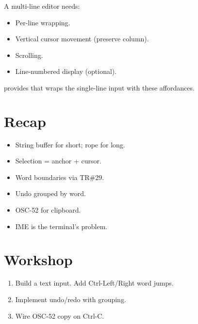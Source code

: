 A multi-line editor needs:
\begin{itemize}[leftmargin=*]
  \item Per-line wrapping.
  \item Vertical cursor movement (preserve column).
  \item Scrolling.
  \item Line-numbered display (optional).
\end{itemize}

\maya{} provides  that wraps the
single-line input with these affordances.

\section{Recap}

\begin{recap}
\begin{itemize}[leftmargin=*]
  \item String buffer for short; rope for long.
  \item Selection = anchor + cursor.
  \item Word boundaries via TR\#29.
  \item Undo grouped by word.
  \item OSC-52 for clipboard.
  \item IME is the terminal's problem.
\end{itemize}
\end{recap}

\section*{Workshop}

\begin{enumerate}[leftmargin=*]
  \item Build a text input. Add Ctrl-Left/Right word jumps.
  \item Implement undo/redo with grouping.
  \item Wire OSC-52 copy on Ctrl-C.
\end{enumerate}
